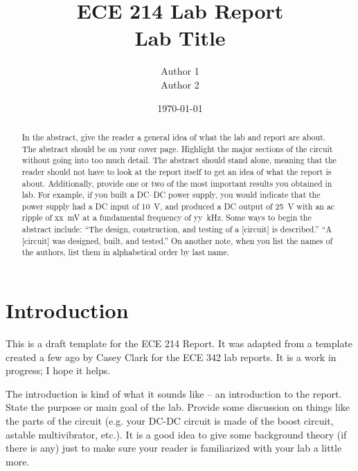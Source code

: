 \documentclass[11pt]{article}
\begin{document}
\title{ \textbf{ECE 214 Lab Report}\\
	Lab Title}
\author{Author 1\\
  	Author 2}
\date{\today}
\maketitle
\thispagestyle{empty}

\begin{abstract}
\noindent In the abstract, give the reader a general idea of what the lab and report are about. The abstract should be on your cover page. Highlight the major sections of the circuit without going into too much detail. The abstract should stand alone, meaning that the reader should not have to look at the report itself to get an idea of what the report is about. Additionally, provide one or two of the most important results you obtained in lab. For example, if you built a DC--DC power supply, you would indicate that the power supply had a DC input of 10~V, and produced a DC output of 25~V with an ac ripple of xx~mV at a fundamental frequency of yy~kHz. Some ways to begin the abstract include:
``The design, construction, and testing of a [circuit] is described.''
``A [circuit] was designed, built, and tested.''
On another note, when you list the names of the authors, list them in alphabetical order by last name.
\end{abstract}

\newpage
\tableofcontents

\newpage
\listoffigures

\newpage
\listoftables

\newpage 
{} %

\section{Introduction}
This is a draft template for the ECE 214 Report. It was adapted from a template created a few ago by Casey Clark for the ECE 342 lab reports. It is a work in progress; I hope it helps.

The introduction is kind of what it sounds like – an introduction to the report. State the purpose or main goal of the lab. Provide some discussion on things like the parts of the circuit (e.g. your DC-DC circuit is made of the boost circuit, astable multivibrator, etc.). It is a good idea to give some background theory (if there is any) just to make sure your reader is familiarized with your lab a little more.
\end{document}
